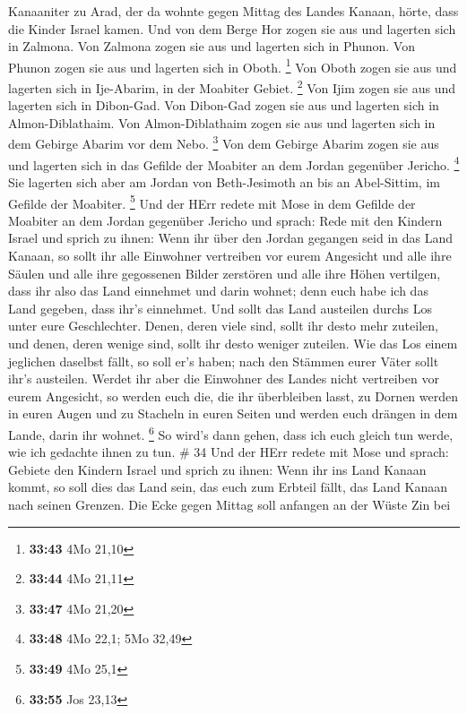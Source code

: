 Kanaaniter zu Arad, der da wohnte gegen Mittag des Landes Kanaan, hörte,
dass die Kinder Israel kamen.  Und von dem Berge Hor zogen
sie aus und lagerten sich in Zalmona.  Von Zalmona zogen
sie aus und lagerten sich in Phunon.  Von Phunon zogen sie
aus und lagerten sich in Oboth. \footnote{\textbf{33:43} 4Mo 21,10}
 Von Oboth zogen sie aus und lagerten sich in Ije-Abarim,
in der Moabiter Gebiet. \footnote{\textbf{33:44} 4Mo 21,11}
 Von Ijim zogen sie aus und lagerten sich in Dibon-Gad.
 Von Dibon-Gad zogen sie aus und lagerten sich in
Almon-Diblathaim.  Von Almon-Diblathaim zogen sie aus und
lagerten sich in dem Gebirge Abarim vor dem Nebo. \footnote{\textbf{33:47}
  4Mo 21,20}  Von dem Gebirge Abarim zogen sie aus und
lagerten sich in das Gefilde der Moabiter an dem Jordan gegenüber
Jericho. \footnote{\textbf{33:48} 4Mo 22,1; 5Mo 32,49}  Sie
lagerten sich aber am Jordan von Beth-Jesimoth an bis an Abel-Sittim, im
Gefilde der Moabiter. \footnote{\textbf{33:49} 4Mo 25,1} 
Und der HErr redete mit Mose in dem Gefilde der Moabiter an dem Jordan
gegenüber Jericho und sprach:  Rede mit den Kindern Israel
und sprich zu ihnen: Wenn ihr über den Jordan gegangen seid in das Land
Kanaan,  so sollt ihr alle Einwohner vertreiben vor eurem
Angesicht und alle ihre Säulen und alle ihre gegossenen Bilder zerstören
und alle ihre Höhen vertilgen,  dass ihr also das Land
einnehmet und darin wohnet; denn euch habe ich das Land gegeben, dass
ihr's einnehmet.  Und sollt das Land austeilen durchs Los
unter eure Geschlechter. Denen, deren viele sind, sollt ihr desto mehr
zuteilen, und denen, deren wenige sind, sollt ihr desto weniger
zuteilen. Wie das Los einem jeglichen daselbst fällt, so soll er's
haben; nach den Stämmen eurer Väter sollt ihr's austeilen. 
Werdet ihr aber die Einwohner des Landes nicht vertreiben vor eurem
Angesicht, so werden euch die, die ihr überbleiben lasst, zu Dornen
werden in euren Augen und zu Stacheln in euren Seiten und werden euch
drängen in dem Lande, darin ihr wohnet. \footnote{\textbf{33:55} Jos
  23,13}  So wird's dann gehen, dass ich euch gleich tun
werde, wie ich gedachte ihnen zu tun. \# 34  Und der HErr
redete mit Mose und sprach:  Gebiete den Kindern Israel und
sprich zu ihnen: Wenn ihr ins Land Kanaan kommt, so soll dies das Land
sein, das euch zum Erbteil fällt, das Land Kanaan nach seinen Grenzen.
 Die Ecke gegen Mittag soll anfangen an der Wüste Zin bei

